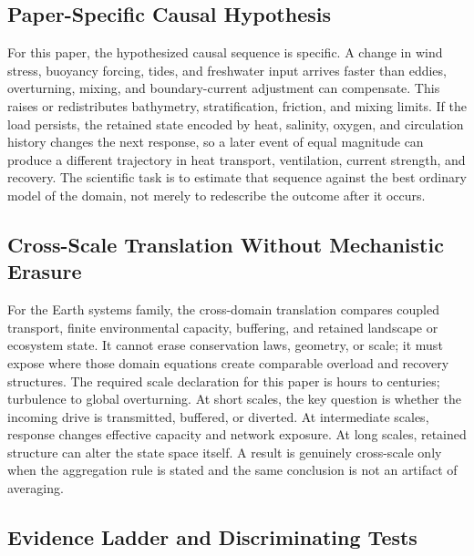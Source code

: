 \documentclass[12pt,a4paper]{article}
\begin{document}
\subsection{Paper-Specific Causal Hypothesis}

For this paper, the hypothesized causal sequence is specific. A change in
wind stress, buoyancy forcing, tides, and freshwater input arrives faster than eddies, overturning, mixing, and boundary-current adjustment can compensate.
This raises or redistributes bathymetry, stratification, friction, and mixing limits. If the load persists,
the retained state encoded by heat, salinity, oxygen, and circulation history changes the next response, so a later event of equal
magnitude can produce a different trajectory in heat transport, ventilation, current strength, and recovery. The
scientific task is to estimate that sequence against the best ordinary model of
the domain, not merely to redescribe the outcome after it occurs.

\subsection{Cross-Scale Translation Without Mechanistic Erasure}

For the Earth systems family, the cross-domain translation compares coupled transport, finite environmental capacity, buffering, and retained landscape or ecosystem state. It cannot erase conservation laws, geometry, or scale; it must expose where those domain equations create comparable overload and recovery structures. \cite{Holling1973,Turing1952,BakTangWiesenfeld1987}
The required scale declaration for this paper is hours to centuries; turbulence to global overturning. At short
scales, the key question is whether the incoming drive is transmitted,
buffered, or diverted. At intermediate scales, response changes effective
capacity and network exposure. At long scales, retained structure can alter the
state space itself. A result is genuinely cross-scale only when the aggregation
rule is stated and the same conclusion is not an artifact of averaging.

\subsection{Evidence Ladder and Discriminating Tests}
\end{document}
